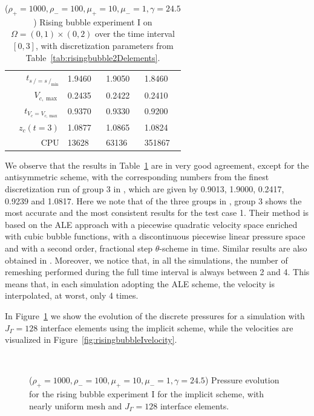 \documentclass[a4paper,12pt,onecolumn]{article}
\newcommand{\strikes}{\mbox{$s\!\!\!\!\:/$}}
\begin{document}
\begin{table}
\begin{tabular}{rlll}
$t_{\strikes = \strikes_{\min}}$ & 1.9460 & 1.9050 & 1.8460 \\
$V_{c,\max}$                     & 0.2435 & 0.2422 & 0.2410 \\
$t_{V_c = V_{c,\max}}$           & 0.9370 & 0.9330 & 0.9200 \\
$z_c(t=3)$                       & 1.0877 & 1.0865 & 1.0824 \\
CPU                              &  13628 &  63136 & 351867 \\
\hline
\end{tabular}
\hspace*{-3.25cm}
\caption[Navier--Stokes rising bubble I benchmark values]
{($\rho_+ = 1000,\rho_- = 100,\mu_+ = 10,\mu_- =1,\gamma = 24.5$)
Rising bubble experiment I on $\Omega = (0,1) \times (0,2)$ over the time
interval $[0,3]$, with discretization parameters from
Table~\ref{tab:risingbubble2Delements}.}
\label{tab:risingbubbleIp2p1p0}
\end{table}
We observe that the results in Table~\ref{tab:risingbubbleIp2p1p0} are in very
good agreement, except for the antisymmetric scheme, with the corresponding
numbers from the finest discretization run of group 3 in \cite{HysingTKPBGT09},
which are given by 0.9013, 1.9000, 0.2417, 0.9239 and 1.0817. Here we note that
of the three groups in \cite{HysingTKPBGT09}, group 3 shows the most accurate
and the most consistent results for the test case 1. Their method is based on
the ALE approach with a piecewise quadratic velocity space enriched with cubic
bubble functions, with a discontinuous piecewise linear pressure space and with
a second order, fractional step $\theta$-scheme in time. Similar results are
also obtained in \cite{fluidfbp}. Moreover, we notice that, in all the
simulations, the number of remeshing performed during the full time interval is
always between 2 and 4. This means that, in each simulation adopting the ALE
scheme, the velocity is interpolated, at worst, only 4 times.

In Figure~\ref{fig:risingbubbleIpressure} we show the evolution of the discrete
pressures for a simulation with $J_\Gamma=128$ interface elements using the
implicit scheme, while the velocities are visualized in
Figure~\ref{fig:risingbubbleIvelocity}.
\begin{figure}[htbp]
\centering
{}
\\
\caption[Navier--Stokes rising bubble I pressure]
{($\rho_+ = 1000,\rho_- = 100,\mu_+ = 10,\mu_- =1,\gamma = 24.5$)
Pressure evolution for the rising bubble experiment I for the implicit scheme,
with nearly uniform mesh and $J_\Gamma=128$ interface elements.}
\label{fig:risingbubbleIpressure}
\end{figure}
\end{document}
